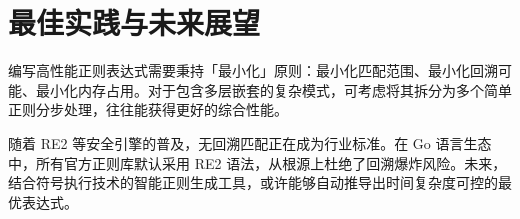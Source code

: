 \chapter{最佳实践与未来展望}
编写高性能正则表达式需要秉持「最小化」原则：最小化匹配范围、最小化回溯可能、最小化内存占用。对于包含多层嵌套的复杂模式，可考虑将其拆分为多个简单正则分步处理，往往能获得更好的综合性能。\par
随着 RE2 等安全引擎的普及，无回溯匹配正在成为行业标准。在 Go 语言生态中，所有官方正则库默认采用 RE2 语法，从根源上杜绝了回溯爆炸风险。未来，结合符号执行技术的智能正则生成工具，或许能够自动推导出时间复杂度可控的最优表达式。\par
